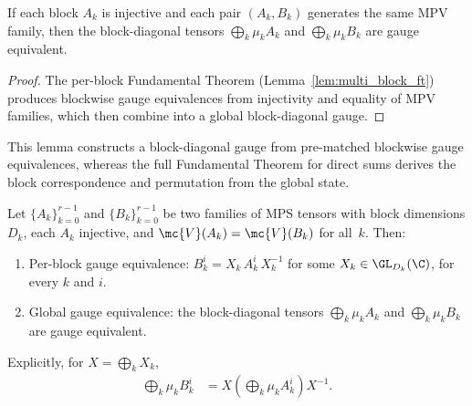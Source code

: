 \begin{lemma}\label{lem:multi_block_global}
    \leanok
    If each block $A_k$ is injective and each pair $(A_k, B_k)$ generates
    the same MPV family, then the block-diagonal tensors
    $\bigoplus_k \mu_k A_k$ and $\bigoplus_k \mu_k B_k$ are gauge equivalent.
\end{lemma}

\begin{proof}\leanok{}
    The per-block Fundamental Theorem (Lemma~\ref{lem:multi_block_ft})
    produces blockwise gauge equivalences from injectivity and equality of
    MPV families, which then combine into a global block-diagonal gauge.
\end{proof}

\begin{remark}
    This lemma constructs a block-diagonal gauge from pre-matched blockwise gauge
    equivalences, whereas the full Fundamental Theorem for direct sums derives
    the block correspondence and permutation from the global state.
\end{remark}

\begin{lemma}%
    \label{lem:fundamentalTheorem_multiBlock_full}
    \leanok
    Let $\{A_k\}_{k=0}^{r-1}$ and $\{B_k\}_{k=0}^{r-1}$ be two families
    of MPS tensors with block dimensions $D_k$, each $A_k$ injective, and
    $\mc{V}(A_k) = \mc{V}(B_k)$ for all~$k$.
    Then:
    \begin{enumerate}
        \item Per-block gauge equivalence:
              $B_k^i = X_k\, A_k^i\, X_k^{-1}$ for some
              $X_k \in \GL_{D_k}(\C)$, for every $k$ and $i$.
        \item Global gauge equivalence: the block-diagonal tensors
              $\bigoplus_k \mu_k A_k$ and $\bigoplus_k \mu_k B_k$ are
              gauge equivalent.
    \end{enumerate}
    Explicitly, for $X=\bigoplus_k X_k$,
    \begin{align}
        \bigoplus_k \mu_k B_k^i
         & = X \left(\bigoplus_k \mu_k A_k^i\right) X^{-1}.
        \label{eq:aft_multiBlock_global_conj}
    \end{align}
\end{lemma}

